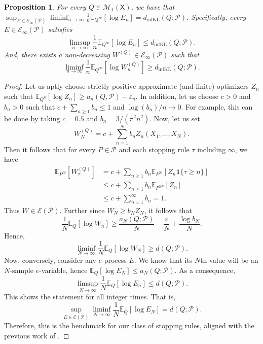 \documentclass[11pt]{article}
\newcommand{\KL}{\mathrm{KL}}
\newcommand{\dinfKL}{d_{\mathrm{infKL}}}
\newcommand{\E}{\mathbb{E}}
\newcommand{\Pcal}{\mathcal{P}}
\newcommand{\X}{\mathsf{X}}
\newtheorem{proposition}[theorem]{Proposition}
\theoremstyle{definition}
\theoremstyle{definition}
\begin{document}
\begin{proposition}\label{prop:integer-benchmark}
For every $Q\in\mathcal M_1(\X)$, we have that $\sup_{E\in \mathcal E_{\infty}(\Pcal)}\liminf_{n\to\infty} \frac1n \E_{Q^{\infty}}[\log E_n]=\dinfKL(Q;\Pcal)$. Specifically, every $E\in\mathcal E_{\infty}(\Pcal)$ satisfies
\[
\limsup_{n\to\infty} \frac1n \E_{Q^{\infty}}[\log E_n]\le \dinfKL(Q;\Pcal).
\]
And, there exists a non-decreasing $W^{(Q)}\in\mathcal E_{\infty}(\Pcal)$ such that
\[
\liminf_{n\to\infty}\frac1n \E_{Q^{\infty}}[\log W_n^{(Q)}]\ge \dinfKL(Q;\Pcal).
\]
\end{proposition}
\begin{proof}
Let us aptly choose strictly positive approximate (and finite) optimizers $Z_n$ such that $\E_{Q^n}[\log Z_n]\ge a_n(Q,\Pcal)-\varepsilon_n$. In addition, let us choose $c>0$  and $b_n>0$ such that $c+\sum_{n\ge 1}b_n\le 1$ and $\log(b_n)/n\to 0$. For example, this can be done by taking $c=0.5$ and $b_n=3/(\pi^2n^2)$. Now, let us set
\[
W_N^{(Q)} = c + \sum_{n=1}^N b_n Z_n(X_1,\dots, X_N).
\]
Then it follows that for every $P\in\Pcal$ and each stopping rule $\tau$ including $\infty$, we have
\begin{align*}
\E_{P^{\infty}} [W_\tau^{(Q)}]&=c+\sum_{n\ge 1} b_n\E_{P^{\infty}}[Z_n\mathbf{1}\{\tau\ge n\}]\\
&\le c+\sum_{n\ge 1}b_n \E_{P^{\otimes n}}[Z_n]\\
&\le c+\sum_{n=1}^{\infty} b_n = 1.
\end{align*}
Thus $W\in\mathcal E(\Pcal)$. Further since $W_N\ge b_N Z_N$, it follows that
\[
\frac{1}{N}\E_Q[\log W_n]\ge \frac{a_N(Q;\Pcal)}{N}-\frac{\varepsilon}{N}+\frac{\log b_N}{N}.
\]
Hence,
\[
\liminf_{N\to\infty}\frac{1}{N}\E_Q[\log W_N]\ge d(Q;\Pcal).
\]
Now, conversely, consider any $e$-process $E$. We know that its $N$th value will be an $N$-sample $e$-variable, hence $\E_Q[\log E_N]\le a_N(Q;\Pcal)$. As a consequence,
\[
\limsup_{N\to\infty} \frac{1}{N}\E_Q[\log E_n]\le d(Q;\Pcal).
\]
This shows the statement for all integer times. That is,
\[
\sup_{E\in\mathcal E(\Pcal)}\liminf_{N\to\infty}\frac1N \E_Q[\log E_N] = d(Q;\Pcal). 
\]
Therefore, this is the benchmark for our class of stopping rules, aligned with the previous work of \cite{ramramdas2026optimalbettingwealth}.
\end{proof}
\end{document}
